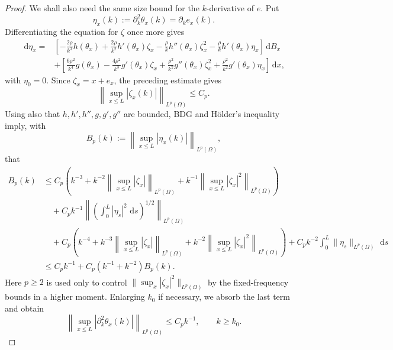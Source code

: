 \documentclass[10pt,a4paper]{amsart}
\newcommand{\dd}{\,\mathrm d}
\begin{document}
\begin{proof}
We shall also need the same size bound for the $k$-derivative of $e$. Put
\[
    \eta_x(k):=\partial_k^2\theta_x(k)=\partial_k e_x(k).
\]
Differentiating the equation for $\zeta$ once more gives
\[
\begin{aligned}
\dd\eta_x={}&
\left[-\frac{2\rho}{k^3}h(\theta_x)
      +\frac{2\rho}{k^2}h'(\theta_x)\zeta_x
      -\frac{\rho}{k}h''(\theta_x)\zeta_x^2
      -\frac{\rho}{k}h'(\theta_x)\eta_x\right]\dd B_x \\
&+\left[\frac{6\rho^2}{k^4}g(\theta_x)
      -\frac{4\rho^2}{k^3}g'(\theta_x)\zeta_x
      +\frac{\rho^2}{k^2}g''(\theta_x)\zeta_x^2
      +\frac{\rho^2}{k^2}g'(\theta_x)\eta_x\right]\dd x,
\end{aligned}
\]
with $\eta_0=0$. Since $\zeta_x=x+e_x$, the preceding estimate gives
\[
    \left\|\sup_{x\le L}|\zeta_x(k)|\right\|_{L^p(\Omega)}\le C_p.
\]
Using also that $h,h',h'',g,g',g''$ are bounded, BDG and H\"older's inequality imply, with
\[
    B_p(k):=\left\|\sup_{x\le L}|\eta_x(k)|\right\|_{L^p(\Omega)},
\]
that
\[
\begin{aligned}
B_p(k)
&\le C_p\left(k^{-3}+k^{-2}\left\|\sup_{x\le L}|\zeta_x|\right\|_{L^p(\Omega)}
        +k^{-1}\left\|\sup_{x\le L}|\zeta_x|^2\right\|_{L^p(\Omega)}\right) \\
&\quad +C_p k^{-1}
   \left\|\left(\int_0^L |\eta_s|^2\,\dd s\right)^{1/2}\right\|_{L^p(\Omega)} \\
&\quad +C_p\left(k^{-4}+k^{-3}\left\|\sup_{x\le L}|\zeta_x|\right\|_{L^p(\Omega)}
        +k^{-2}\left\|\sup_{x\le L}|\zeta_x|^2\right\|_{L^p(\Omega)}\right)
      +C_p k^{-2}\int_0^L\|\eta_s\|_{L^p(\Omega)}\,\dd s  \\
&\le C_p k^{-1}+C_p(k^{-1}+k^{-2})B_p(k).
\end{aligned}
\]
Here $p\ge2$ is used only to control $\|\sup_x|\zeta_x|^2\|_{L^p(\Omega)}$ by the fixed-frequency bounds in a higher moment. Enlarging $k_0$ if necessary, we absorb the last term and obtain
\begin{equation}\label{eq:eta-fixed-bound}
    \left\|\sup_{x\le L}|\partial_k^2\theta_x(k)|\right\|_{L^p(\Omega)}
    \le C_p k^{-1},
    \qquad k\ge k_0 .
\end{equation}


\end{proof}
\end{document}
